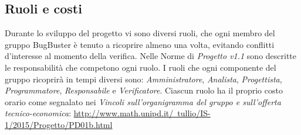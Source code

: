 \subsection{Ruoli e costi}
Durante lo sviluppo del progetto vi sono diversi ruoli, che ogni membro del gruppo BugBuster è tenuto a ricoprire almeno una volta, evitando conflitti d’interesse al momento della verifica. Nelle Norme di \textit{Progetto v1.1} sono descritte le responsabilità che competono ogni ruolo. I ruoli che ogni componente del gruppo ricoprirà in tempi diversi sono: \textit{Amministratore}, \textit{Analista}, \textit{Progettista}, \textit{Programmatore}, \textit{Responsabile} e \textit{Verificatore}.
Ciascun ruolo ha il proprio costo orario come segnalato nei \textit{Vincoli sull’organigramma del gruppo e sull’offerta tecnico-economica}:
\href{http://www.math.unipd.it/~tullio/IS-1/2015/Progetto/PD01b.html}{http://www.math.unipd.it/~tullio/IS-1/2015/Progetto/PD01b.html}



